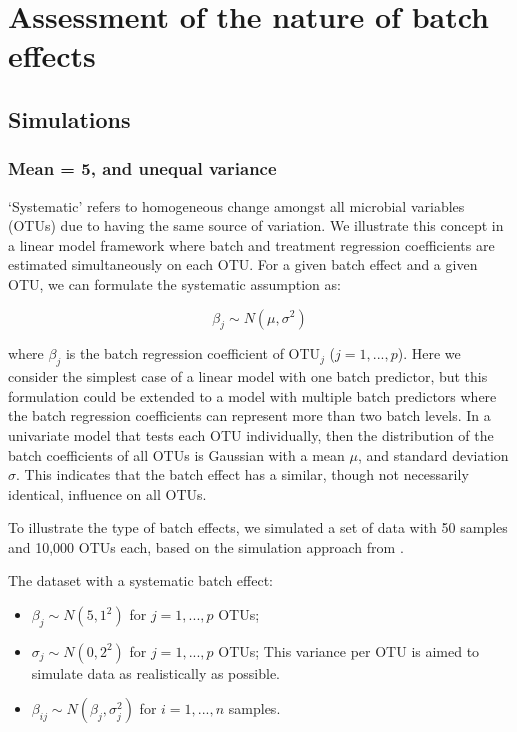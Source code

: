 \documentclass[]{book}
\providecommand{\tightlist}{%
  \setlength{\itemsep}{0pt}\setlength{\parskip}{0pt}}
\begin{document}
\chapter{Assessment of the nature of batch effects}\label{simu}

\section{Simulations}\label{simulations}

\subsection{Mean = 5, and unequal
variance}\label{mean-5-and-unequal-variance}

`Systematic' refers to homogeneous change amongst all microbial
variables (OTUs) due to having the same source of variation. We
illustrate this concept in a linear model framework where batch and
treatment regression coefficients are estimated simultaneously on each
OTU. For a given batch effect and a given OTU, we can formulate the
systematic assumption as:

\[\beta_{j} \sim N(\mu,\sigma^{2})\]

where \(\beta_{j}\) is the batch regression coefficient of OTU\(_{j}\)
(\(j = 1,...,p\)). Here we consider the simplest case of a linear model
with one batch predictor, but this formulation could be extended to a
model with multiple batch predictors where the batch regression
coefficients can represent more than two batch levels. In a univariate
model that tests each OTU individually, then the distribution of the
batch coefficients of all OTUs is Gaussian with a mean \(\mu\), and
standard deviation \(\sigma\). This indicates that the batch effect has
a similar, though not necessarily identical, influence on all OTUs.

To illustrate the type of batch effects, we simulated a set of data with
50 samples and 10,000 OTUs each, based on the simulation approach from
\citep{gagnon2013removing}.

The dataset with a systematic batch effect:

\begin{itemize}
\tightlist
\item
  \(\beta_{j} \sim N(5,1^{2})\) for \(j=1,...,p\) OTUs;\\
\item
  \(\sigma_{j} \sim N(0,2^{2})\) for \(j=1,...,p\) OTUs; This variance
  per OTU is aimed to simulate data as realistically as possible.\\
\item
  \(\beta_{ij} \sim N(\beta_{j}, \sigma_{j}^{2})\) for \(i = 1,...,n\)
  samples.
\end{itemize}
\end{document}
